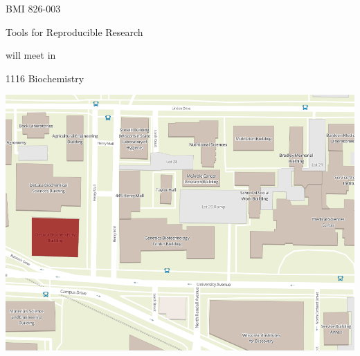 \documentclass[12pt]{article}
\begin{document}
\thispagestyle{empty}

\Huge
\centering
\sffamily

BMI 826-003

Tools for Reproducible Research

will meet in

{\color{red} 1116 Biochemistry}


\vfill

\includegraphics[width=\textwidth]{room_notice.png}
\end{document}

